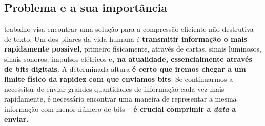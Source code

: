 \documentclass[10pt,journal,compsoc]{IEEEtran}
\begin{document}
    
    \maketitle
    
    
    \IEEEdisplaynontitleabstractindextext
    
    
    
    \IEEEpeerreviewmaketitle
    
    
    \subsection{Problema e a sua importância}
     trabalho visa encontrar uma solução para a compressão eficiente não destrutiva de texto. Um dos pilares da vida humana é \textbf{transmitir informação o mais rapidamente possível}, primeiro fisicamente, através de cartas, sinais luminosos, sinais sonoros, impulsos elétricos e\textbf{, na atualidade, essencialmente através de bits digitais}. A determinada altura \textbf{é certo que iremos chegar a um limite físico da rapidez com que enviamos bits}. Se continuarmos a necessitar de enviar grandes quantidades de informação cada vez mais rapidamente, é necessário encontrar uma maneira de representar a mesma informação com menor número de bits – \textbf{é crucial comprimir a \textit{data} a enviar.}
    
\end{document}
